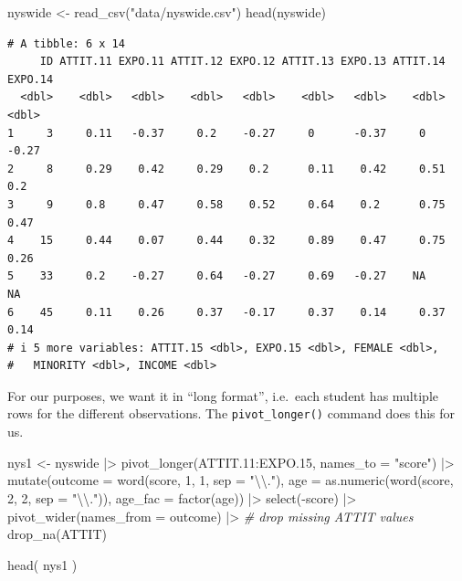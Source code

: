 \documentclass[
  letterpaper,
  DIV=11,
  numbers=noendperiod]{scrreprt}
\newenvironment{Shaded}{\begin{snugshade}}{\end{snugshade}}
\newcommand{\AttributeTok}[1]{\textcolor[rgb]{0.49,0.56,0.16}{#1}}
\newcommand{\CommentTok}[1]{\textcolor[rgb]{0.38,0.63,0.69}{\textit{#1}}}
\newcommand{\DecValTok}[1]{\textcolor[rgb]{0.25,0.63,0.44}{#1}}
\newcommand{\FloatTok}[1]{\textcolor[rgb]{0.25,0.63,0.44}{#1}}
\newcommand{\FunctionTok}[1]{\textcolor[rgb]{0.02,0.16,0.49}{#1}}
\newcommand{\NormalTok}[1]{\textcolor[rgb]{0.00,0.44,0.13}{#1}}
\newcommand{\OtherTok}[1]{\textcolor[rgb]{0.00,0.44,0.13}{#1}}
\newcommand{\SpecialCharTok}[1]{\textcolor[rgb]{0.25,0.44,0.63}{#1}}
\newcommand{\StringTok}[1]{\textcolor[rgb]{0.25,0.44,0.63}{#1}}
\begin{document}
\begin{Shaded}
\begin{Highlighting}[]
\NormalTok{nyswide }\OtherTok{\textless{}{-}} \FunctionTok{read\_csv}\NormalTok{(}\StringTok{"data/nyswide.csv"}\NormalTok{)}
\FunctionTok{head}\NormalTok{(nyswide)}
\end{Highlighting}
\end{Shaded}

\begin{verbatim}
# A tibble: 6 x 14
     ID ATTIT.11 EXPO.11 ATTIT.12 EXPO.12 ATTIT.13 EXPO.13 ATTIT.14 EXPO.14
  <dbl>    <dbl>   <dbl>    <dbl>   <dbl>    <dbl>   <dbl>    <dbl>   <dbl>
1     3     0.11   -0.37     0.2    -0.27     0      -0.37     0      -0.27
2     8     0.29    0.42     0.29    0.2      0.11    0.42     0.51    0.2 
3     9     0.8     0.47     0.58    0.52     0.64    0.2      0.75    0.47
4    15     0.44    0.07     0.44    0.32     0.89    0.47     0.75    0.26
5    33     0.2    -0.27     0.64   -0.27     0.69   -0.27    NA      NA   
6    45     0.11    0.26     0.37   -0.17     0.37    0.14     0.37    0.14
# i 5 more variables: ATTIT.15 <dbl>, EXPO.15 <dbl>, FEMALE <dbl>,
#   MINORITY <dbl>, INCOME <dbl>
\end{verbatim}

For our purposes, we want it in ``long format'', i.e.~each student has
multiple rows for the different observations. The
\texttt{pivot\_longer()} command does this for us.

\begin{Shaded}
\begin{Highlighting}[]
\NormalTok{nys1 }\OtherTok{\textless{}{-}}\NormalTok{ nyswide }\SpecialCharTok{|\textgreater{}} 
  \FunctionTok{pivot\_longer}\NormalTok{(ATTIT}\FloatTok{.11}\SpecialCharTok{:}\NormalTok{EXPO}\FloatTok{.15}\NormalTok{, }\AttributeTok{names\_to =} \StringTok{"score"}\NormalTok{) }\SpecialCharTok{|\textgreater{}} 
  \FunctionTok{mutate}\NormalTok{(}\AttributeTok{outcome =} \FunctionTok{word}\NormalTok{(score, }\DecValTok{1}\NormalTok{, }\DecValTok{1}\NormalTok{, }\AttributeTok{sep =} \StringTok{"}\SpecialCharTok{\textbackslash{}\textbackslash{}}\StringTok{."}\NormalTok{),}
         \AttributeTok{age =} \FunctionTok{as.numeric}\NormalTok{(}\FunctionTok{word}\NormalTok{(score, }\DecValTok{2}\NormalTok{, }\DecValTok{2}\NormalTok{, }\AttributeTok{sep =} \StringTok{"}\SpecialCharTok{\textbackslash{}\textbackslash{}}\StringTok{."}\NormalTok{)),}
         \AttributeTok{age\_fac =} \FunctionTok{factor}\NormalTok{(age)) }\SpecialCharTok{|\textgreater{}} 
  \FunctionTok{select}\NormalTok{(}\SpecialCharTok{{-}}\NormalTok{score) }\SpecialCharTok{|\textgreater{}} 
  \FunctionTok{pivot\_wider}\NormalTok{(}\AttributeTok{names\_from =}\NormalTok{ outcome) }\SpecialCharTok{|\textgreater{}} 
  \CommentTok{\# drop missing ATTIT values}
  \FunctionTok{drop\_na}\NormalTok{(ATTIT)}

\FunctionTok{head}\NormalTok{( nys1 )}
\end{Highlighting}
\end{Shaded}
\end{document}
